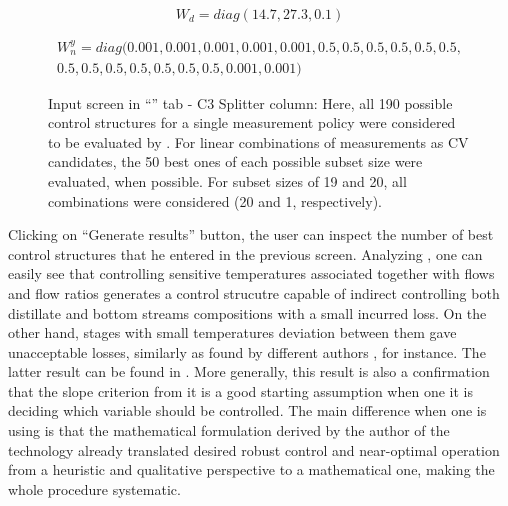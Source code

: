 \documentclass[../../msc-thesis.tex]{subfiles}
\begin{document}
\begin{equation}
	W_{d} = diag(14.7, 27.3, 0.1)
	\label{eq:wdc3}
\end{equation}

\begin{equation}
    \begin{split}
        W_{n}^{y} = diag(0.001,0.001,0.001,0.001,0.001,0.5,0.5,0.5,0.5,0.5,0.5,\\
        0.5,0.5,0.5,0.5,0.5,0.5,0.5,0.001,0.001)
        \label{eq:wnyc3}
    \end{split}
\end{equation}

\begin{figure}[htb]
    \centering
    \caption{Input screen in \mtc ``\soc'' tab - C3 Splitter column: Here, all 
    190 possible control structures for a single measurement policy were 
    considered to be evaluated by \mtc. For linear combinations of 
    measurements as CV candidates, the 50 best ones of each possible 
    subset size were evaluated, when possible. For subset sizes of 19 and 
    20, all combinations were considered (20 and 1, respectively).}
    \label{fig:c3splittersocinput}
\end{figure}

Clicking on ``Generate results'' button, the user can inspect the number of 
best control structures that he entered in the previous screen. Analyzing 
, one can easily see that controlling sensitive 
temperatures associated together with flows and flow ratios generates a 
control strucutre capable of indirect controlling both distillate and bottom 
streams compositions with a small incurred loss. On the other hand, stages 
with small temperatures deviation between them gave unacceptable losses, 
similarly as found by different authors \textcite{Alves2018,Hori2007}, for 
instance. The latter result can be found in . 
More generally, this result is also a confirmation that the slope criterion 
from \textcite{Luyben2006} it is a good starting assumption when one
it is deciding which variable should be controlled. The main difference when 
one is using \soc is that the mathematical formulation derived by the 
author of the technology already translated desired robust control and 
near-optimal operation from a heuristic and qualitative perspective to 
a mathematical one, making the whole procedure systematic.
\end{document}
